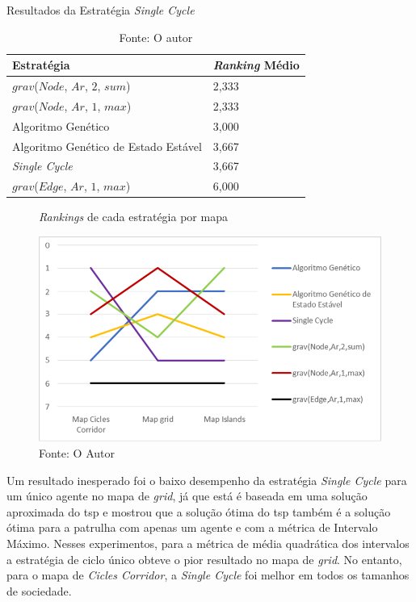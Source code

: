 \begin{table}
	\centering
	\caption{Resultados da Estratégia \textit{Single Cycle}}
	\label{ranking_medios}
	\begin{tabularx}{\linewidth}{|X|X|}
		\hline
		\textbf{Estratégia} & \textbf{\textit{Ranking} Médio} \\
		\hline
		$grav$($Node$, $Ar$, $2$, $sum$) & 2,333 \\
		\hline
		$grav$($Node$, $Ar$, $1$, $max$) & 2,333 \\
		\hline
		Algoritmo Genético & 3,000 \\
		\hline
		Algoritmo Genético de Estado Estável & 3,667 \\
		\hline
		\textit{Single Cycle} & 3,667 \\
		\hline
		$grav$($Edge$, $Ar$, $1$, $max$) & 6,000 \\
		\hline
	\end{tabularx}
	\caption*{Fonte: O autor}
\end{table}

\begin{figure}
	\caption[\textit{Rankings} de cada estratégia por mapa]{\textit{Rankings} de 
		cada estratégia por mapa}
	\centering
	\includegraphics[width=\columnwidth]{images/rank_all.png}
	\caption*{Fonte: O Autor}
	\label{fig:rank_all}
\end{figure}

Um resultado inesperado foi o baixo desempenho da estratégia 
\textit{Single Cycle} para um único agente no mapa de \textit{grid}, já que está 
é baseada em uma solução aproximada do \ac{tsp} e 
\citep{Chevaleyre:2004:TAM:1018411.1019013} mostrou que a solução ótima do 
\ac{tsp} também é a solução ótima para a patrulha com apenas um agente e com a 
métrica de Intervalo Máximo. Nesses experimentos, para a métrica de média 
quadrática dos intervalos a estratégia de ciclo único obteve o pior resultado no 
mapa de \textit{grid}. No entanto, para o mapa de \textit{Cicles Corridor}, a 
\textit{Single Cycle} foi melhor em todos os tamanhos de sociedade.

